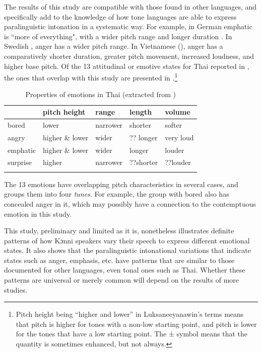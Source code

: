 \documentclass[output=paper]{langsci/langscibook}
\begin{document}
The results of this study are compatible with those found in other languages, and specifically add to the knowledge of how tone languages are able to express paralinguistic intonation in a systematic way. For example, in German emphatic is ``more of everything", with a wider pitch range and longer duration \citep[91]{gibbon1998}.  In Swedish \citep[122--123]{garding1998}, anger has a wider pitch range. In Vietnamese (\citealt[402, 412--413]{doetal1998,brunelleetal2012}), anger has a comparatively shorter duration, greater pitch movement, increased loudness, and higher base pitch. Of the 13 attitudinal or emotive states for Thai reported in \citet[382]{luksaneeyanawin1998}, the ones that overlap with this study are presented in .\footnote{Pitch height being ``higher and lower'' in Luksaneeyanawin's terms means that pitch is higher for tones with a non-low starting point, and pitch is lower for the tones that have a low starting point. The ± symbol means that the quantity is sometimes enhanced, but not always.}


\begin{table}
\begin{tabular}{lllll}
\lsptoprule
 & pitch height & range & length & volume\\\midrule
bored & lower & narrower & shorter & softer\\
angry & higher \& lower & wider & ?? longer & very loud\\
emphatic & higher \& lower & wider & longer & louder\\
surprise & higher & narrower & ??shorter & ??louder\\
\lspbottomrule
\end{tabular}

\caption{Properties of emotions in Thai (extracted from \citealt[382]{luksaneeyanawin1998})}
\label{tab:6.cahill}

\end{table}



The 13 emotions have overlapping pitch characteristics in several cases, and \citeauthor{luksaneeyanawin1998} groups them into four \emph{tunes}. For example, the group with bored also has concealed anger in it, which may possibly have a connection to the contemptuous emotion in this study.

This study, preliminary and limited as it is, nonetheless illustrates definite patterns of how Kɔnni speakers vary their speech to express different emotional states. It also shows that the paralinguistic intonational variations that indicate states such as anger, emphasis, etc. have patterns that are similar to those documented for other languages, even tonal ones such as Thai. Whether these patterns are universal or merely common will depend on the results of more studies.
\end{document}

